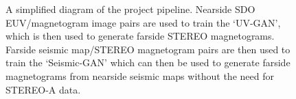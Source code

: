\documentclass[11pt,a4paper,onecolumn]{report}
\begin{document}
\begin{figure}
\begin{tikzpicture}[node distance=4cm]
  \end{tikzpicture}
  \caption{A simplified diagram of the project pipeline. Nearside SDO
  EUV/magnetogram image pairs are used to train the `UV-GAN', which is then
  used to generate farside STEREO magnetograms. Farside seismic map/STEREO
  magnetogram pairs are then used to train the `Seismic-GAN' which can then be
  used to generate farside magnetograms from nearside seismic maps without the
  need for STEREO-A data.}
  \label{fig:simple_diagram}
\end{figure}






\end{document}
